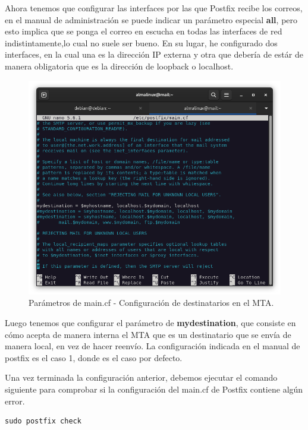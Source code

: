 Ahora tenemos que configurar las interfaces por las que Postfix recibe los correos, en el manual de administración se puede indicar un parámetro especial \textbf{all}, pero esto implica que se ponga el correo en escucha en todas las interfaces de red indistintamente,lo cual no suele ser bueno. En su lugar, he configurado dos interfaces, en la cual una es la dirección IP externa y otra que debería de estár de manera obligatoria que es la dirección de loopback o localhost.

\begin{figure}[H]
	\centering
	\includegraphics[scale=0.30]{04}
	\caption{Parámetros de main.cf - Configuración de destinatarios en el MTA.}
\end{figure}

Luego tenemos que configurar el parámetro de \textbf{mydestination}, que consiste en cómo acepta de manera interna el MTA que es un destinatario que se envía de manera local, en vez de hacer reenvío. La configuración indicada en el manual de postfix es el caso 1, donde es el caso por defecto.
\vspace{5mm}

Una vez terminada la configuración anterior, debemos ejecutar el comando siguiente para comprobar si la configuración del main.cf de Postfix contiene algún error.

\begin{lstlisting}[style=mybash]
sudo postfix check
\end{lstlisting}

